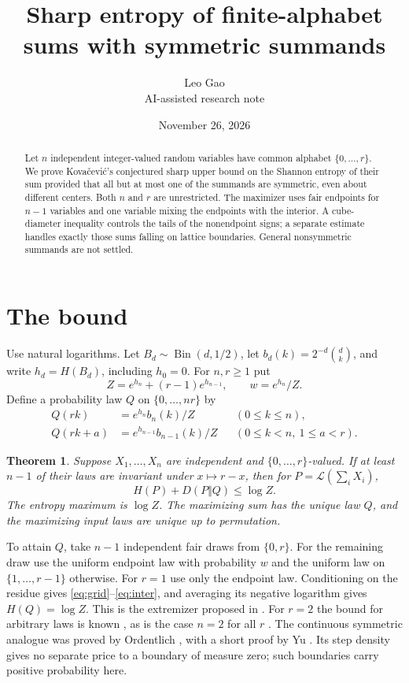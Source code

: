 \documentclass[11pt]{article}
\title{Sharp entropy of finite-alphabet sums with symmetric summands}
\author{Leo Gao\\{\small AI-assisted research note}}
\date{November 26, 2026}
\newtheorem{theorem}{Theorem}
\newcommand{\Bin}{\operatorname{Bin}}
\begin{document}
\maketitle
\begin{abstract}
Let $n$ independent integer-valued random variables have common alphabet
$\{0,\ldots,r\}$. We prove Kova\v{c}evi\'c's conjectured sharp upper bound on the
Shannon entropy of their sum provided that all but at most one of the
summands are symmetric, even about different centers. Both $n$ and $r$ are unrestricted.
The maximizer uses fair endpoints for $n-1$ variables and one variable
mixing the endpoints with the interior. A cube-diameter inequality controls
the tails of the nonendpoint signs; a separate estimate handles exactly
those sums falling on lattice boundaries. General nonsymmetric summands are not settled.
\end{abstract}

\section{The bound}
Use natural logarithms. Let $B_d\sim\Bin(d,1/2)$, let
$b_d(k)=2^{-d}\binom dk$, and write $h_d=H(B_d)$, including $h_0=0$.
For $n,r\ge1$ put
\[
 Z=e^{h_n}+(r-1)e^{h_{n-1}},\qquad w=e^{h_n}/Z.
\]
Define a probability law $Q$ on $\{0,\ldots,nr\}$ by
\begin{align}
 Q(rk)&=e^{h_n} b_n(k)/Z &&(0\le k\le n),\label{eq:grid}\\
 Q(rk+a)&=e^{h_{n-1}}b_{n-1}(k)/Z &&(0\le k<n,\ 1\le a<r).\label{eq:inter}
\end{align}

\begin{theorem}
Suppose $X_1,\ldots,X_n$ are independent and $\{0,\ldots,r\}$-valued.
If at least $n-1$ of their laws are invariant under $x\mapsto r-x$,
then for $P=\mathcal L(\sum_i X_i)$,
\[
 H(P)+D(P\Vert Q)\le \log Z.
\]
The entropy maximum is $\log Z$. The maximizing sum has the unique law
$Q$, and the maximizing input laws are unique up to permutation.
\end{theorem}

To attain $Q$, take $n-1$ independent fair draws from $\{0,r\}$.
For the remaining draw use the uniform endpoint law with probability $w$
and the uniform law on $\{1,\ldots,r-1\}$ otherwise.
For $r=1$ use only the endpoint law. Conditioning on the residue gives
\eqref{eq:grid}--\eqref{eq:inter}, and averaging its negative logarithm gives $H(Q)=\log Z$.
This is the extremizer proposed in \cite{K21}. For $r=2$ the bound for
arbitrary laws is known \cite{K26}, as is the case $n=2$ for all $r$
\cite{K21}. The continuous symmetric analogue was proved by Ordentlich
\cite{O06}, with a short proof by Yu \cite{Y08}. Its step density gives no separate
price to a boundary of measure zero; such boundaries carry positive probability here.
\end{document}
